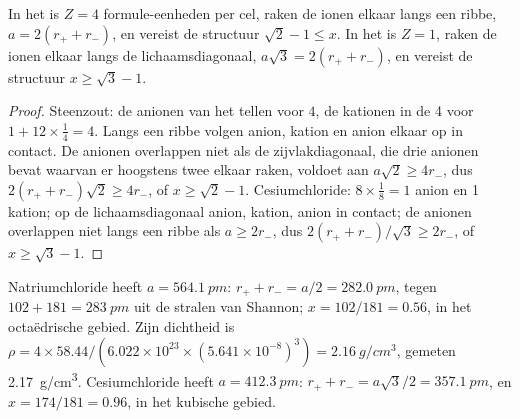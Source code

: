 \begin{proposition}\label{prop:b1:crystals-ionic-covalent:nacl-cscl}
In het  is $Z = 4$ formule-eenheden per cel, raken de ionen
elkaar langs een ribbe, $a = 2(r_+ + r_-)$, en vereist de structuur
$\sqrt2 - 1
\le x$. In het  is $Z = 1$, raken de ionen elkaar langs
de lichaamsdiagonaal, $a\sqrt3 = 2(r_+ + r_-)$, en vereist de structuur
$x \ge \sqrt3 - 1$.
\end{proposition}

\begin{proof}
Steenzout: de anionen van het  tellen voor $4$, de kationen in
de 4  voor $1 + 12 \times \frac14 = 4$. Langs een
ribbe volgen anion, kation en anion elkaar op in contact. De anionen
overlappen niet als de zijvlakdiagonaal, die drie anionen bevat waarvan
er hoogstens twee elkaar raken, voldoet aan $a\sqrt2 \ge 4r_-$, dus
$2(r_+ + r_-)\sqrt2 \ge
4r_-$, of $x \ge \sqrt2 - 1$. Cesiumchloride: $8 \times \frac18 = 1$
anion en 1 kation; op de lichaamsdiagonaal anion, kation, anion in
contact; de anionen overlappen niet langs een ribbe als $a \ge 2r_-$, dus
$2(r_+ + r_-)/\sqrt3 \ge 2r_-$, of $x \ge \sqrt3 - 1$.
\end{proof}

\begin{example}\label{ex:b1:crystals-ionic-covalent:nacl}
Natriumchloride heeft $a = \qty{564.1}{pm}$: $r_+ + r_- = a/2 =
\qty{282.0}{pm}$, tegen $102 + 181 = \qty{283}{pm}$ uit de stralen van
Shannon; $x = 102/181 = 0.56$, in het octaëdrische gebied. Zijn
dichtheid is $\rho = 4 \times 58.44/(6.022 \times 10^{23} \times (5.641 \times
10^{-8})^3) = \qty{2.16}{g/cm^3}$, gemeten \qty{2.17}{g/cm^3}.
Cesiumchloride heeft $a = \qty{412.3}{pm}$: $r_+ + r_- = a\sqrt3/2 =
\qty{357.1}{pm}$, en $x = 174/181 = 0.96$, in het kubische gebied.
\end{example}

